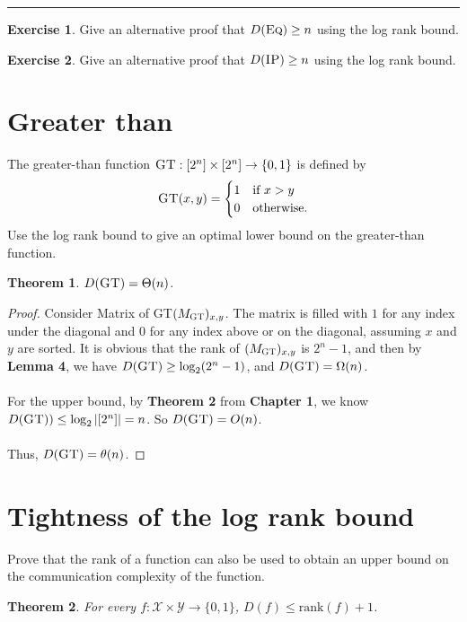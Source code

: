 \documentclass[11pt,oneside]{book}
\theoremstyle{plain}
\newtheorem{theorem}{Theorem}
\theoremstyle{definition}
\newtheorem{exercise}{Exercise}
\theoremstyle{plain}
\newcommand{\calX}{\mathcal{X}}
\newcommand{\calY}{\mathcal{Y}}
\newcommand{\Eq}{\textsc{Eq}}
\newcommand{\GT}{\textsc{GT}}
\newcommand{\IP}{\textsc{IP}}
\newcommand{\rank}{\mathrm{rank}}
\newcommand{\exercises}{\bigskip \noindent\rule{8cm}{0.4pt} \medskip}
\begin{document}
\exercises

\begin{exercise} %
	Give an alternative proof that $D(\Eq) \ge n$ using the log rank bound.
\end{exercise}

\begin{exercise}
	Give an alternative proof that $D(\IP) \ge n$ using the log rank bound.\end{exercise}


 \section{Greater than}

The greater-than function $\GT : [2^n] \times [2^n] \to \{0,1\}$ is defined by
\[
\GT(x,y) = \begin{cases}
1 & \mbox{if } x > y \\
0 & \mbox{otherwise.}
\end{cases}
\]
Use the log rank bound to give an optimal lower bound on the greater-than function.

\begin{theorem}
	$D(\GT) = \Theta(n)$.
\end{theorem}

\begin{proof}
	Consider Matrix of \GT $(M_{\GT})_{x,y}$. The matrix is filled with $1$ for any index under the diagonal and $0$ for any index above or on the diagonal, assuming $x$ and $y$ are sorted. It is obvious that the rank of $(M_{\GT})_{x,y}$ is $2^n-1$, and then by \textbf{Lemma 4}, we have $D(\GT) \ge \log_2 (2^n-1)$, and $D(\GT) = \Omega(n)$.\\
	\\
	For the upper bound, by \textbf{Theorem 2} from \textbf{Chapter 1}, we know $D(\GT)) \leq \log_2 |[2^n]| = n$. So $D(\GT) = O(n)$. \\
	\\
	Thus, $D(\GT) = \theta(n)$.
\end{proof}



 \section{Tightness of the log rank bound}

Prove that the rank of a function can also be used to obtain an upper bound on the communication complexity of the function.

\begin{theorem}
	For every $f : \calX \times \calY \to \{0,1\}$, $D(f) \le \rank(f) + 1$.
\end{theorem}
\end{document}
